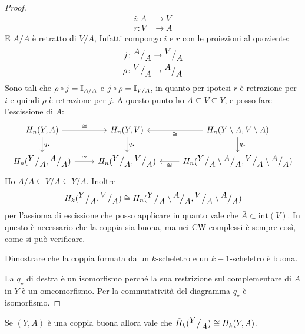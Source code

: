\begin{proof}
  \begin{align*}
    i \colon A & \to V \\
    r \colon V & \to A
  \end{align*}
  E $ {A} \slash {A} $ è retratto di $ {V} \slash {A} $,
  Infatti compongo $ i $ e $ r $ con le proiezioni al quoziente:
  \begin{align*}
    j \colon {^{\textstyle A}\big/_{\textstyle A}} & \to {^{\textstyle V}\big/_{\textstyle A}} \\
    \rho \colon {^{\textstyle V}\big/_{\textstyle A}} & \to {^{\textstyle A}\big/_{\textstyle A}}
  \end{align*}
  Sono tali che $ \rho \circ j = \Id{{A} \slash {A}} $ e $ j \circ \rho = \Id{{V} \slash {A}} $,
  in quanto per ipotesi $ r $ è retrazione per $ i $ e
  quindi $ \rho $ è retrazione per $ j $.
  A questo punto ho $ A \subseteq V \subseteq Y $, e posso fare l'escissione di $ A $:
  \[
    \begin{tikzcd}
      H_n(Y,A) \rar{\cong} \dar{q_\star} & H_n(Y,V)  \dar{q_\star}& H_n({Y} \setminus {A}, {V} \setminus {A}) \lar{\cong} \dar{q_\star} \\
      H_n(\quot{Y}{A}, \quot{A}{A}) \rar{\cong} & H_n(\quot{Y}{A}, \quot{V}{A}) & H_n(\quot{Y}{A} \setminus \quot{A}{A}, \quot{V}{A} \setminus \quot{A}{A}) \lar{\cong}
    \end{tikzcd}
  \]
  Ho $ {A} \slash {A} \subseteq {V} \slash {A} \subseteq {Y} \slash {A} $.
  Inoltre
  \[
    H_k({^{\textstyle Y}\big/_{\textstyle A}}, {^{\textstyle V}\big/_{\textstyle A}}) \cong H_n({^{\textstyle Y}\big/_{\textstyle A}} \setminus {^{\textstyle A}\big/_{\textstyle A}}, {^{\textstyle V}\big/_{\textstyle A}} \setminus {^{\textstyle A}\big/_{\textstyle A}})
  \]
  per l'assioma di escissione che posso applicare in quanto vale che $ \bar{A} \subset \mathrm{int}(V) $.
  In questo è necessario che la coppia sia buona, ma nei CW complessi è sempre così, come si può
  verificare.
  \begin{exercise}
    Dimostrare che la coppia formata da un $ k $-scheletro e un $ k-1 $-scheletro è buona.
  \end{exercise}
  La $ q_\star $ di destra è un isomorfismo perché la sua restrizione sul complementare di $ A $
  in $ Y $ è un omeomorfismo. Per la commutatività del diagramma $ q_\star $ è isomorfismo.
\end{proof}
\begin{corollary}
  Se $ (Y,A) $ è una coppia buona allora vale che $ \tilde{H}_k({^{\textstyle Y}\big/_{\textstyle A}}) \cong H_k(Y,A) $.
\end{corollary}

